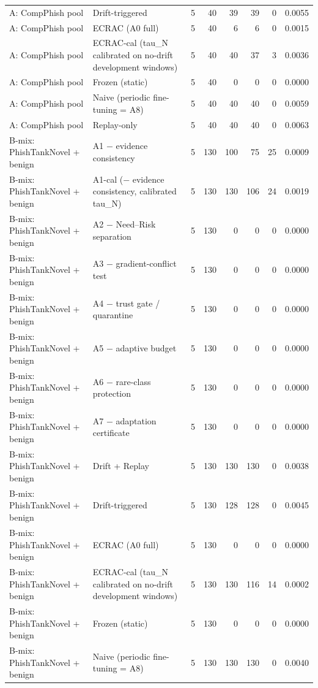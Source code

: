 \begin{table}[t]
\begin{tabular}{llrrrrrr}
A: CompPhish pool & Drift-triggered & 5 & 40 & 39 & 39 & 0 & 0.0055 \\
A: CompPhish pool & ECRAC (A0 full) & 5 & 40 & 6 & 6 & 0 & 0.0015 \\
A: CompPhish pool & ECRAC-cal (tau\_N calibrated on no-drift development windows) & 5 & 40 & 40 & 37 & 3 & 0.0036 \\
A: CompPhish pool & Frozen (static) & 5 & 40 & 0 & 0 & 0 & 0.0000 \\
A: CompPhish pool & Naive (periodic fine-tuning = A8) & 5 & 40 & 40 & 40 & 0 & 0.0059 \\
A: CompPhish pool & Replay-only & 5 & 40 & 40 & 40 & 0 & 0.0063 \\
B-mix: PhishTankNovel + benign & A1 − evidence consistency & 5 & 130 & 100 & 75 & 25 & 0.0009 \\
B-mix: PhishTankNovel + benign & A1-cal (− evidence consistency, calibrated tau\_N) & 5 & 130 & 130 & 106 & 24 & 0.0019 \\
B-mix: PhishTankNovel + benign & A2 − Need–Risk separation & 5 & 130 & 0 & 0 & 0 & 0.0000 \\
B-mix: PhishTankNovel + benign & A3 − gradient-conflict test & 5 & 130 & 0 & 0 & 0 & 0.0000 \\
B-mix: PhishTankNovel + benign & A4 − trust gate / quarantine & 5 & 130 & 0 & 0 & 0 & 0.0000 \\
B-mix: PhishTankNovel + benign & A5 − adaptive budget & 5 & 130 & 0 & 0 & 0 & 0.0000 \\
B-mix: PhishTankNovel + benign & A6 − rare-class protection & 5 & 130 & 0 & 0 & 0 & 0.0000 \\
B-mix: PhishTankNovel + benign & A7 − adaptation certificate & 5 & 130 & 0 & 0 & 0 & 0.0000 \\
B-mix: PhishTankNovel + benign & Drift + Replay & 5 & 130 & 130 & 130 & 0 & 0.0038 \\
B-mix: PhishTankNovel + benign & Drift-triggered & 5 & 130 & 128 & 128 & 0 & 0.0045 \\
B-mix: PhishTankNovel + benign & ECRAC (A0 full) & 5 & 130 & 0 & 0 & 0 & 0.0000 \\
B-mix: PhishTankNovel + benign & ECRAC-cal (tau\_N calibrated on no-drift development windows) & 5 & 130 & 130 & 116 & 14 & 0.0002 \\
B-mix: PhishTankNovel + benign & Frozen (static) & 5 & 130 & 0 & 0 & 0 & 0.0000 \\
B-mix: PhishTankNovel + benign & Naive (periodic fine-tuning = A8) & 5 & 130 & 130 & 130 & 0 & 0.0040 \\

\end{tabular}
\end{table}
